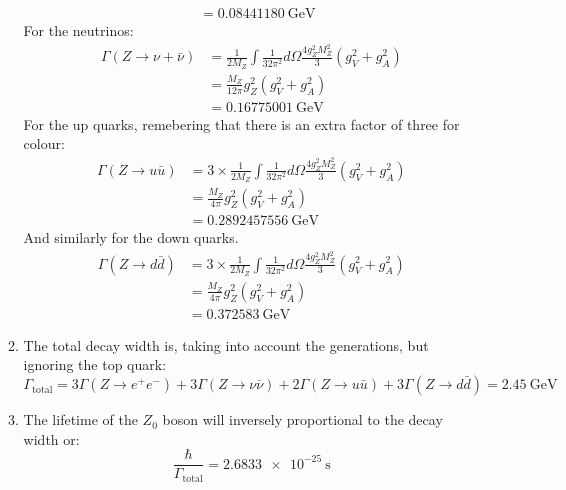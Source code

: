 \documentclass[12pt,a4]{article}
\begin{document}
\begin{enumerate}
\begin{enumerate}
\begin{align*}
                                &= \SI{0.08441180}{\giga \eV}
        \end{align*}
        For the neutrinos:
        \begin{align*}
          \Gamma(Z \to \nu+ \bar{\nu}) 
                                &= \frac{1}{2 M_Z}\int \frac{1}{32 \pi^2} d\Omega \frac{4 g_Z^2 M_Z^2}{3} (g_V^2 + g_A^2) \\
                                &= \frac{M_Z}{12 \pi } g_Z^2 (g_V^2 + g_A^2) \\
                                &= \SI{0.16775001}{\giga \eV}
        \end{align*}
        For the up quarks, remebering that there is an extra factor of three for colour:
        \begin{align*}
          \Gamma(Z \to u \bar{u}) 
                                &= 3 \times \frac{1}{2 M_Z}\int \frac{1}{32 \pi^2} d\Omega \frac{4 g_Z^2 M_Z^2}{3} (g_V^2 + g_A^2) \\
                                &= \frac{M_Z}{4 \pi } g_Z^2 (g_V^2 + g_A^2) \\
                                &= \SI{0.2892457556}{\giga \eV}
        \end{align*}
        And similarly for the down quarks.
        \begin{align*}
          \Gamma(Z \to d \bar{d}) 
                                &= 3 \times \frac{1}{2 M_Z}\int \frac{1}{32 \pi^2} d\Omega \frac{4 g_Z^2 M_Z^2}{3} (g_V^2 + g_A^2) \\
                                &= \frac{M_Z}{4 \pi } g_Z^2 (g_V^2 + g_A^2) \\
                                &= \SI{0.372583}{\giga \eV}
        \end{align*}
      \item
        The total decay width is, taking into account the generations, but ignoring the top quark:
        \begin{equation*}
          \Gamma_\text{total} = 3 \Gamma(Z \to e^+ e^-) + 3 \Gamma(Z \to \nu \bar{\nu}) + 2 \Gamma(Z \to u \bar{u}) +  3 \Gamma(Z \to d \bar{d}) = \SI{2.45}{\giga \eV}
        \end{equation*}
      \item
        The lifetime of the $Z_0$ boson will inversely proportional to the decay width or:
        \begin{equation*}
          \frac{\hbar}{\Gamma_{\text{total}}} = \SI{2.6833e-25}{\second}
        \end{equation*}

\end{enumerate}
\end{enumerate}
\end{document}
